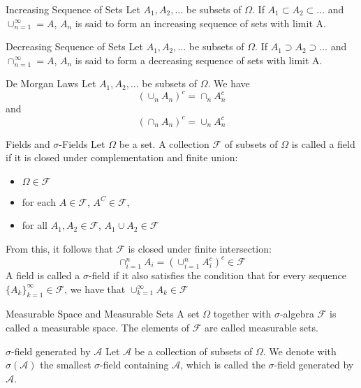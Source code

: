 \documentclass[avery5371,grid]{flashcards}
\begin{document}
\begin{flashcard}[Definition]{Increasing Sequence of Sets}
Let $A_1,A_2,\ldots$ be subsets of $\Omega$. If $A_1 \subset A_2 \subset \ldots$ and 
$\cup_{n=1}^\infty = A$, $A_n$ is said to form an increasing sequence of sets with limit A.
\end{flashcard}

\begin{flashcard}[Definition]{Decreasing Sequence of Sets}
Let $A_1,A_2,\ldots$ be subsets of $\Omega$. If $A_1 \supset A_2 \supset \ldots$ and 
$\cap_{n=1}^\infty = A$, $A_n$ is said to form a decreasing sequence of sets with limit A.
\end{flashcard}


\begin{flashcard}[Theorem]{De Morgan Laws}
Let $A_1,A_2,\ldots$ be subsets of $\Omega$. We have
\[
\left(\cup_n A_n\right)^c = \cap_n A_n^c 
\]
and
\[
\left( \cap_n A_n \right)^c = \cup_n A_n^c
\]
\end{flashcard}


\begin{flashcard}[Definition]{Fields and $\sigma$-Fields}
\scriptsize
Let $\Omega$ be a set. A collection $\mathcal{F}$ of subsets of $\Omega$ is called a 
field if it is closed under complementation and finite union:
\begin{itemize}
 \item $\Omega \in \mathcal{F}$
 \item for each $A \in \mathcal{F}$, $A^C \in \mathcal F$, 
 \item for all $A_1,A_2 \in \mathcal{F}$, $A_1 \cup A_2 \in \mathcal{F}$ 
\end{itemize}
From this, it follows that $\mathcal{F}$ is closed under finite intersection:
\[
\cap_{i=1}^n A_i = \left( \cup_{i=1}^n A_i^c \right)^c \in \mathcal{F}
\]
A field is called a $\sigma$-field if it also satisfies the condition that for every
sequence $\{A_k\}_{k=1}^\infty \in \mathcal F$, we have that  $\cup_{k=1}^\infty A_k \in \mathcal{F}$
\end{flashcard}

\begin{flashcard}[Definition]{Measurable Space and Measurable Sets}
A set $\Omega$ together with $\sigma$-algebra $\mathcal{F}$ is called a measurable space. The elements 
of $\mathcal{F}$ are called measurable sets.
\end{flashcard}

\begin{flashcard}[Definition]{$\sigma$-field generated by $\mathcal{A}$}
 Let $\mathcal{A}$ be a collection of subsets of $\Omega$. We denote with $\sigma\left( \mathcal{A} \right)$
 the smallest $\sigma$-field containing $\mathcal{A}$, which is called the $\sigma$-field generated by $\mathcal{A}$. 
\end{flashcard}
\end{document}
